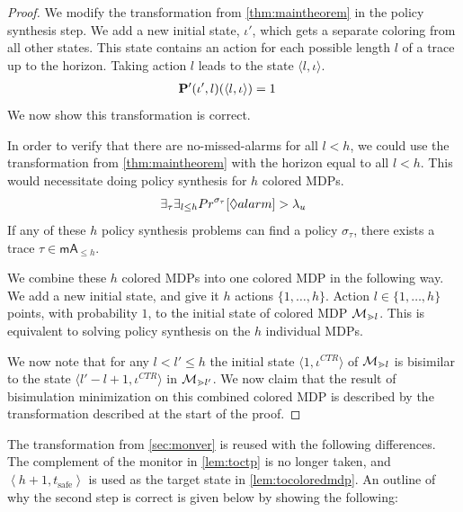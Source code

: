 \documentclass[runningheads]{llncs}
\newcommand{\lm}[2][]{\todo[color=cyan!50!white,#1]{\footnotesize{Luko: #2}}}
\newcommand{\tsafe}{t_{\text{safe}}}
\newcommand{\safes}[1][h+1]{\left\langle #1, \tsafe\right\rangle}
\newcommand{\missedalarms}[2]{\mathsf{mA}_{#1}^{#2}}
\begin{document}
{\leqhtheorem*
\begin{proof}
    We modify the transformation from \cref{thm:maintheorem} in the policy synthesis step. We add a new initial state, $\iota'$, which gets a separate coloring from all other states. This state contains an action for each possible length $l$ of a trace up to the horizon. Taking action $l$ leads to the state $\langle l, \iota\rangle$.
    \begin{align*}
        \mathbf{P}'(\iota', l)(\langle l, \iota\rangle) & = 1
    \end{align*}
    We now show this transformation is correct.

    In order to verify that there are no-missed-alarms for all $l<h$, we could use the transformation from \cref{thm:maintheorem} with the horizon equal to all $l<h$. This would necessitate doing policy synthesis for $h$ colored MDPs.
    \[ \exists_{\tau} \exists_{l\leq h} {Pr}^{\sigma_\tau}[\lozenge alarm] > \lambda_u \]
    If any of these $h$ policy synthesis problems can find a policy $\sigma_\tau$, there exists a trace $\tau\in\missedalarms{\leq h}{}$.

    We combine these $h$ colored MDPs into one colored MDP in the following way.
    We add a new initial state, and give it $h$ actions $\{1,\ldots,h\}$. Action $l\in\{1,\ldots,h\}$ points, with probability $1$, to the initial state of colored MDP $\mathcal{M}_{\gtrdot l}$. This is equivalent to solving policy synthesis on the $h$ individual MDPs.

    We now note that for any $l<l'\leq h$ the initial state $\langle 1, \iota^{CTR}\rangle$ of $\mathcal{M}_{\gtrdot l}$ is bisimilar to the state $\langle l' - l + 1, \iota^{CTR} \rangle$ in $\mathcal{M}_{\gtrdot l'}$. We now claim that the result of bisimulation minimization on this combined colored MDP is described by the transformation described at the start of the proof.
\end{proof}

\nfa*
\begin{proofoutline}
    The transformation from \cref{sec:monver} is reused with the following differences. The complement of the monitor in \cref{lem:toctp} is no longer taken, and $\safes$ is used as the target state in \cref{lem:tocoloredmdp}. An outline of why the second step is correct is given below by showing the following:


\end{proofoutline}}
\end{document}
